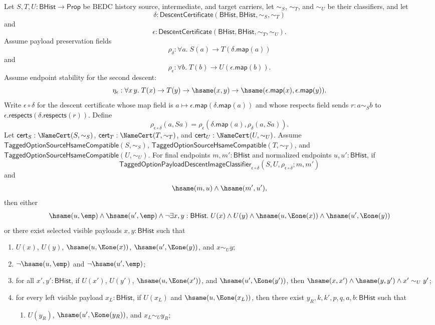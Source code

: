 \begin{theorem}
Let $S,T,U:\mathsf{BHist}\to\mathsf{Prop}$ be BEDC history source,
intermediate, and target carriers, let $\sim_S$, $\sim_T$, and $\sim_U$ be their
classifiers, and let
$$
\delta:\mathsf{DescentCertificate}(\mathsf{BHist},\mathsf{BHist},\sim_S,\sim_T)
$$
and
$$
\epsilon:\mathsf{DescentCertificate}(\mathsf{BHist},\mathsf{BHist},\sim_T,\sim_U).
$$
Assume payload preservation fields
$$
\rho_{\delta}:\forall a.\;S(a)\to T(\delta.\mathsf{map}(a))
$$
and
$$
\rho_{\epsilon}:\forall b.\;T(b)\to U(\epsilon.\mathsf{map}(b)).
$$
Assume endpoint stability for the second descent:
$$
\eta_{\epsilon}:\forall x\,y.\;
T(x)\to T(y)\to \hsame(x,y)\to
\hsame(\epsilon.\mathsf{map}(x),\epsilon.\mathsf{map}(y)).
$$
Write $\epsilon\circ\delta$ for the descent certificate whose map field is
$a\mapsto\epsilon.\mathsf{map}(\delta.\mathsf{map}(a))$ and whose respects field
sends $r:a\sim_S b$ to
$\epsilon.\mathsf{respects}(\delta.\mathsf{respects}(r))$. Define
$$
\rho_{\epsilon\circ\delta}(a,Sa)=
\rho_{\epsilon}(\delta.\mathsf{map}(a),\rho_{\delta}(a,Sa)).
$$
Let $\mathsf{cert}_S:\NameCert(S,\sim_S)$,
$\mathsf{cert}_T:\NameCert(T,\sim_T)$, and
$\mathsf{cert}_U:\NameCert(U,\sim_U)$. Assume
$\mathsf{TaggedOptionSourceHsameCompatible}(S,\sim_S)$,
$\mathsf{TaggedOptionSourceHsameCompatible}(T,\sim_T)$, and
$\mathsf{TaggedOptionSourceHsameCompatible}(U,\sim_U)$. For final endpoints
$m,m':\mathsf{BHist}$ and normalized endpoints $u,u':\mathsf{BHist}$, if
$$
\mathsf{TaggedOptionPayloadDescentImageClassifier}_{\epsilon\circ\delta}
(S,U,\rho_{\epsilon\circ\delta};m,m')
$$
and
$$
\hsame(m,u)\land \hsame(m',u'),
$$
then either
$$
\hsame(u,\emp)\land \hsame(u',\emp)\land
\neg\exists x,y:\mathsf{BHist}.\;
U(x)\land U(y)\land
\hsame(u,\Eone(x))\land
\hsame(u',\Eone(y))
$$
or there exist selected visible payloads $x,y:\mathsf{BHist}$ such that
\begin{enumerate}
\item $U(x)$, $U(y)$, $\hsame(u,\Eone(x))$, $\hsame(u',\Eone(y))$, and
$x\sim_U y$;
\item $\neg\hsame(u,\emp)$ and $\neg\hsame(u',\emp)$;
\item for all $x',y':\mathsf{BHist}$, if $U(x')$, $U(y')$,
$\hsame(u,\Eone(x'))$, and $\hsame(u',\Eone(y'))$, then
$\hsame(x,x')\land \hsame(y,y')\land x'\sim_U y'$;
\item for every left visible payload $x_L:\mathsf{BHist}$, if $U(x_L)$ and
$\hsame(u,\Eone(x_L))$, then there exist $y_R,k,k',p,q,a,b:\mathsf{BHist}$ such
that
\begin{enumerate}
\item $U(y_R)$, $\hsame(u',\Eone(y_R))$, and $x_L\sim_U y_R$;

\end{enumerate}
\end{enumerate}
\end{theorem}
